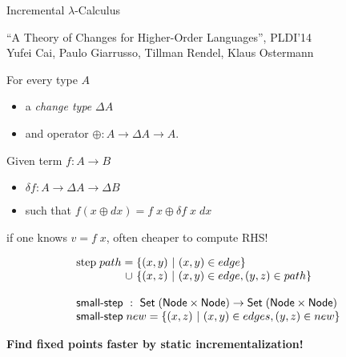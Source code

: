 \documentclass{beamer}
\newcommand{\ms}{\mathsf}
\newcommand{\x}{\times}
\newcommand{\setfor}[2]{\{#1 ~|~ #2\}}
\begin{document}

\begin{frame}
  \Huge \centering
  Incremental $\lambda$-Calculus\vspace{0.5cm}

  \large ``A Theory of Changes for Higher-Order Languages'', PLDI'14\\Yufei
  Cai, Paulo Giarrusso, Tillman Rendel, Klaus Ostermann
\end{frame}

\begin{frame}
  \Large For every type $A$
  \begin{itemize}
  \item a \emph{change type} $\Delta A$ 
  \item and operator $\oplus : A \to \Delta A \to A$.
  \end{itemize}
  \vspace{0.5cm}

  Given term $f : A \to B$\\
  \begin{itemize}
  \item $\delta f : A \to \Delta A \to \Delta B$
  \item such that $f(x \oplus dx) = f\; x \oplus \delta f\; x\; dx$
  \end{itemize}
  if one knows $v = f\; x$, often cheaper to compute RHS!
\end{frame}

\begin{frame}

  \pause
  \large
  \[\begin{array}{l}
    \text{step}\; path =
    \setfor{(x,y)}{(x,y) \in edge}\\
    \phantom{\text{step}\;path} \hspace{1.15pt}\cup\hspace{1.15pt}
    \setfor{(x,z)}{(x,y) \in edge, (y,z) \in path}\\
    \\
    \textsf{small-step} ~:~ \ms{Set}\;(\ms{Node} \x \ms{Node})
    \to \ms{Set}\;(\ms{Node} \x \ms{Node})\\
    \textsf{small-step} \; new =
    \setfor{(x,z)}{(x,y) \in edges, (y,z) \in new}\\
  \end{array}\]
  \vspace{0cm}

  \pause
  \huge\bf Find fixed points faster by static incrementalization!
\end{frame}
\end{document}
